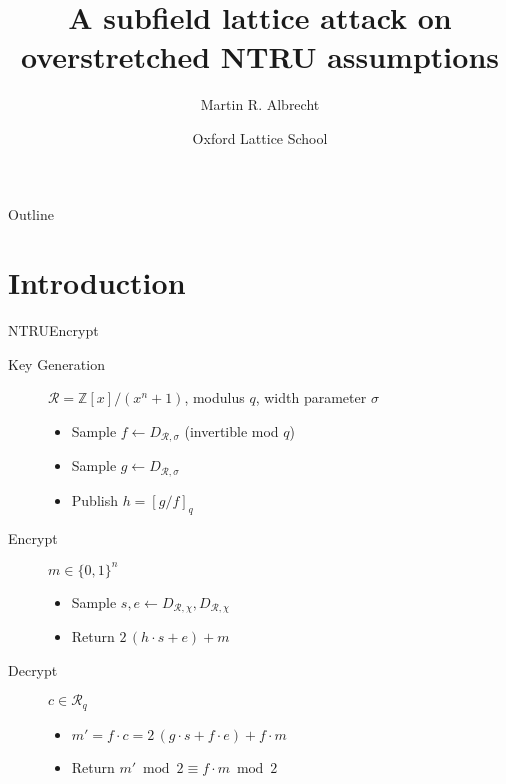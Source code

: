 \documentclass[presentation,smaller]{beamer}
\author{Martin R. Albrecht}
\date{Oxford Lattice School}
\title{A subfield lattice attack on overstretched NTRU assumptions}
\newcommand{\cR}{\ensuremath{\mathcal{R}}\xspace}
\newcommand{\Z}{\ensuremath{\mathbb Z}\xspace}
\begin{document}
\maketitle
\begin{frame}{Outline}
\tableofcontents
\end{frame}


\section{Introduction}
\label{sec:org62d380d}

\begin{frame}[label={sec:orgc6e9aef}]{NTRUEncrypt}
\begin{description}
\item[{Key Generation}] \(\cR = \Z[x]/(x^n+1)\), modulus \(q\), width parameter \(σ\)
\begin{itemize}
\item Sample \(f \gets D_{\cR, σ}\) (invertible mod \(q\))
\item Sample \(g \gets D_{\cR, σ}\)
\item Publish \(h = {[g/f]}_q\)
\end{itemize}

\item[{Encrypt}] \(m ∈ \{0,1\}^n\)
\begin{itemize}
\item Sample \(s,e \gets D_{\cR,χ}, D_{\cR,χ}\)
\item Return \(2\, (h ⋅ s + e) + m\)
\end{itemize}

\item[{Decrypt}] \(c ∈ \cR_q\)
\begin{itemize}
\item \(m' = f ⋅ c = 2\, (g ⋅ s + f ⋅ e) + f ⋅ m\)
\item Return  \(m' \bmod 2 ≡ f ⋅ m \bmod 2\)
\end{itemize}
\end{description}

\end{frame}
\end{document}
